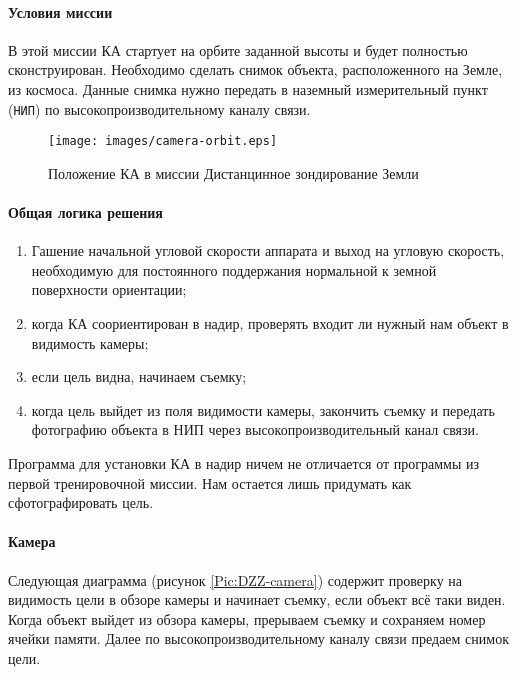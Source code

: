 \documentclass[12pt,a4paper]{article}
\begin{document}
\paragraph{Условия миссии} В этой миссии КА стартует на орбите
заданной высоты и будет полностью сконструирован. Необходимо сделать снимок объекта, расположенного на Земле, из космоса. Данные снимка нужно передать в наземный измерительный пункт (\verb'НИП') по высокопроизводительному каналу связи.

\begin{figure}[tbh]
  \begin{center}
    \texttt{[image: images/camera-orbit.eps]}
    \caption{Положение КА в миссии Дистанцинное зондирование Земли}
    \label{Pic:Camera-DZZ}
  \end{center}
\end{figure}

\paragraph{Общая логика решения} 

\begin{enumerate}
\item Гашение начальной угловой скорости аппарата и выход на угловую скорость, необходимую для постоянного поддержания нормальной к земной поверхности ориентации;
\item когда КА соориентирован в надир, проверять входит ли нужный нам объект в видимость камеры;
\item если цель видна, начинаем съемку;
\item когда цель выйдет из поля видимости камеры, закончить съемку и передать фотографию объекта в НИП через высокопроизводительный канал связи.
\end{enumerate}

Программа для установки КА в надир ничем не отличается от программы из первой тренировочной миссии. Нам остается лишь придумать как сфотографировать цель.

\paragraph{Камера} Следующая диаграмма (рисунок \ref{Pic:DZZ-camera}) содержит проверку на видимость цели в обзоре камеры и начинает съемку, если объект всё таки виден. Когда объект выйдет из обзора камеры, прерываем съемку и сохраняем номер ячейки памяти. Далее по высокопроизводительному каналу связи предаем снимок цели.
\end{document}
